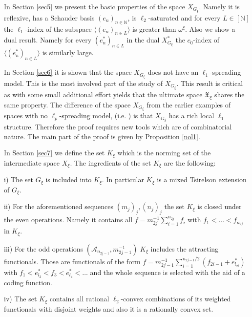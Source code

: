 \documentclass[a4paper]{amsart}
\theoremstyle{plain}
\newcommand{\N}{\mathbb{N}}
\newcommand{\mc}{\mathcal}
\newcommand{\xn}[1][x]{(#1_{n})_{n\in\N}}
\begin{document}
In Section \ref{sec5} we present the basic properties of the space $X_{G_{\xi}}$. Namely it is reflexive, has a Schauder basis $\xn[e]$, is $\ell_2$-saturated and for every $L\in [\N]$ the  $\ell_{1}$-index of the subspace $\langle (e_n)_{n\in L}\rangle $ is greater than $\omega^{\xi}$.
Also we show a dual result. Namely for every $(e_n^{*})_{n\in L}$  in the dual $X_{G_{\xi}}^{*}$ the  $c_{0}$-index of  $\langle (e_{n}^{*})_{n\in L}\rangle $ is similarly large.


In Section \ref{sec6} it is shown that the space $X_{G_\xi}$ does not have an
$\ell_{1}$-spreading model. This is the most involved part of the study of $X_{G_{\xi}}$.
This result is critical as with some small additional effort yields that the ultimate
space $\mathfrak{X}_{\xi}$ shares the same property. The difference of the space
$X_{G_{\xi}}$ from the earlier examples of spaces with no $\ell_{p}$-spreading model,
(i.e. \cite{OSsm})  is that $X_{G_{\xi}}$ has a rich local $\ell_{1}$ structure.
Therefore the proof requires new tools which are of combinatorial nature. The main part
of the proof is given by Proposition \ref{nol1}.

In Section \ref{sec7} we define the set $K_{\xi}$ which is the norming set of the intermediate space $X_{\xi}$.  The ingredients of the set $K_{\xi}$ are the following:

i)  The  set $G_{\xi}$  is included into $K_{\xi}$. In particular $K_{\xi}$ is a  mixed Tsirelson extension of $G_{\xi}$.

ii) For the aforementioned  sequences $(m_j)_{j}, (n_{j})_{j}$  the set  $K_{\xi}$  is closed under the  even operations. Namely  it contains all  $f=m_{2j}^{-1}\sum_{i=1}^{n_{2j}}f_{i}$ with $f_{1}<\dots<f_{n_{2j}}$ in
$K_{\xi}$.

iii) For the odd operations
$(\mc{A}_{n_{2j-1}},m_{2j-1}^{-1})$ $K_{\xi}$
includes the attracting functionals.
Those  are functionals of the form
$f=m_{2j-1}^{-1}\sum_{i=1}^{n_{2j-1}/2}(f_{2i-1}+e_{l_{2i}}^{*})$
with $f_{1}<e^{*}_{l_2}<f_{3}<e^{*}_{l_4}<\dots$
and the whole sequence is selected with the aid of a coding function.

iv)  The set $K_{\xi}$ contains all rational $\ell_{2}$-convex combinations of its
weighted functionals with disjoint weights and also  it is a rationally convex set.
\end{document}

